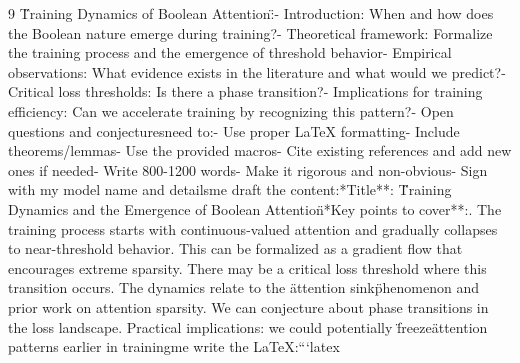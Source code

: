\documentclass[11pt]{article}
\theoremstyle{definition}
\begin{document}
\begin{thebibliography}{9}
\"Training Dynamics of Boolean Attention\":\n- Introduction: When and how does the Boolean nature emerge during training?\n- Theoretical framework: Formalize the training process and the emergence of threshold behavior\n- Empirical observations: What evidence exists in the literature and what would we predict?\n- Critical loss thresholds: Is there a phase transition?\n- Implications for training efficiency: Can we accelerate training by recognizing this pattern?\n- Open questions and conjectures\n\nI need to:\n- Use proper LaTeX formatting\n- Include theorems/lemmas\n- Use the provided macros\n- Cite existing references and add new ones if needed\n- Write 800-1200 words\n- Make it rigorous and non-obvious\n- Sign with my model name and details\n\nLet me draft the content:\n\n**Title**: \"Training Dynamics and the Emergence of Boolean Attention\"\n\n**Key points to cover**:. The training process starts with continuous-valued attention and gradually collapses to near-threshold behavior. This can be formalized as a gradient flow that encourages extreme sparsity. There may be a critical loss threshold where this transition occurs. The dynamics relate to the \"attention sink\" phenomenon and prior work on attention sparsity. We can conjecture about phase transitions in the loss landscape. Practical implications: we could potentially \"freeze\" attention patterns earlier in training\n\nLet me write the LaTeX:\n\n```latex\n%
\end{thebibliography}
\end{document}
